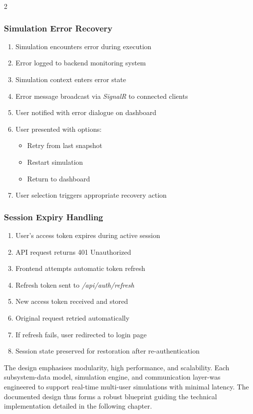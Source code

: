 \begin{multicols}{2}
\subsubsection*{Simulation Error Recovery}
\begin{enumerate}
    \item Simulation encounters error during execution
    \item Error logged to backend monitoring system
    \item Simulation context enters error state
    \item Error message broadcast via \textit{SignalR} to connected clients
    \item User notified with error dialogue on dashboard
    \item User presented with options:
    \begin{itemize}
        \item Retry from last snapshot
        \item Restart simulation
        \item Return to dashboard
    \end{itemize}
    \item User selection triggers appropriate recovery action
\end{enumerate}

\subsubsection*{Session Expiry Handling}
\begin{enumerate}
    \item User's access token expires during active session
    \item API request returns 401 Unauthorized
    \item Frontend attempts automatic token refresh
    \item Refresh token sent to \textit{/api\allowbreak/auth\allowbreak/refresh}
    \item New access token received and stored
    \item Original request retried automatically
    \item If refresh fails, user redirected to login page
    \item Session state preserved for restoration after re-authentication
\end{enumerate}

\end{multicols}




The design emphasises modularity, high performance, and scalability. Each subsystem-data model, simulation engine, and communication layer-was engineered to support real-time multi-user simulations with minimal latency. The documented design thus forms a robust blueprint guiding the technical implementation detailed in the following chapter.